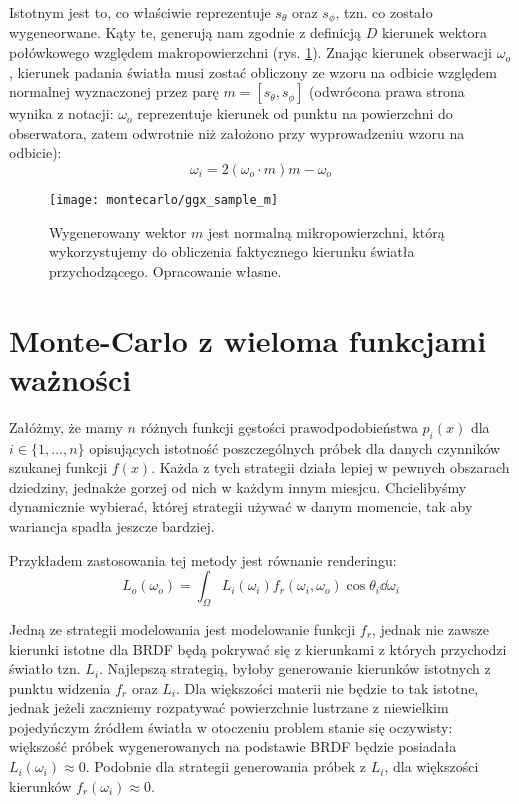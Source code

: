 \documentclass[../main.tex]{subfiles}
\begin{document}
Istotnym jest to, co właściwie reprezentuje $s_\theta$ oraz $s_\phi$, tzn. co zostało wygeneorwane. Kąty te, generują nam zgodnie z definicją $D$ kierunek wektora połówkowego względem makropowierzchni (rys. \ref{fig:GGXSampleMReflect}). Znając kierunek obserwacji $\omega_o$, kierunek padania światła musi zostać obliczony ze wzoru na odbicie względem normalnej wyznaczonej przez parę $m = [s_\theta, s_\phi]$ (odwrócona prawa strona wynika z notacji: $\omega_o$ reprezentuje kierunek od punktu na powierzchni do obserwatora, zatem odwrotnie niż założono przy wyprowadzeniu wzoru na odbicie):
\[
	\omega_i = 2(\omega_o \cdot m)m - \omega_o
\]

\begin{figure}[h]
    \centering
    \texttt{[image: montecarlo/ggx\_sample\_m]}
    \caption{Wygenerowany wektor $m$ jest normalną mikropowierzchni, którą wykorzystujemy do obliczenia faktycznego kierunku światła przychodzącego. Opracowanie własne.}
    \label{fig:GGXSampleMReflect}
\end{figure}

\section{Monte-Carlo z wieloma funkcjami ważności}
\label{Chapter:MIS}

Załóżmy, że mamy $n$ różnych funkcji gęstości prawodpodobieństwa $p_{i}(x)$ dla
$i \in \{ 1, \ldots, n \}$ opisujących istotność poszczególnych próbek dla
danych czynników szukanej funkcji $f(x)$. Każda z tych strategii działa lepiej
w pewnych obszarach dziedziny, jednakże gorzej od nich w każdym innym miesjcu.
Chcielibyśmy dynamicznie wybierać, której strategii używać w danym momencie,
tak aby wariancja spadła jeszcze bardziej.

Przykładem zastosowania tej metody jest równanie renderingu:
\[
L_o(\omega_o) = \int_{\Omega} {
	L_i(\omega_{i})
	f_r(\omega_{i}, \omega_{o})
	\cos \theta_{i}
	\dd\omega_{i}
}
\]

Jedną ze strategii modelowania jest modelowanie funkcji $f_r$, jednak nie zawsze kierunki istotne dla BRDF będą pokrywać się z kierunkami z których przychodzi światło tzn. $L_i$. Najlepszą strategią, byłoby generowanie kierunków istotnych z punktu widzenia $f_r$ oraz $L_i$. Dla większości materii nie będzie to tak istotne, jednak jeżeli zaczniemy rozpatywać powierzchnie lustrzane z niewielkim pojedyńczym źródłem światła w otoczeniu problem stanie się oczywisty: większość próbek wygenerowanych na podstawie BRDF będzie posiadała $L_i(\omega_i) \approx 0$. Podobnie dla strategii generowania próbek z $L_i$, dla większości kierunków $f_r(\omega_i) \approx 0$.
\end{document}
